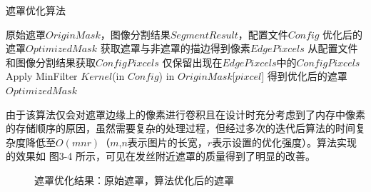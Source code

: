 \documentclass[a4paper,AutoFakeBold,oneside,12pt]{book}
\begin{document}
\begin{algorithm} 
	\begin{spacing}{1.3}
		\caption{遮罩优化算法} 
		\label{MaskOptimizationAlgorithm}
		\renewcommand{\algorithmicrequire}{\textbf{输入：}}
		\renewcommand{\algorithmicensure}{\textbf{输出：}} 
			\begin{algorithmic}[1] 
				\Require 原始遮罩$OriginMask$，图像分割结果$SegmentResult$，配置文件$Config$
				\Ensure 优化后的遮罩$OptimizedMask$
				\State 获取遮罩与非遮罩的描边得到像素$EdgePixcels$
				\State 从配置文件和图像分割结果获取$ConfigPixcels$
                \State 仅保留出现在$EdgePixcels$中的$ConfigPixcels$
                    \State Apply MinFilter $Kernel$(in $Config$) in $OriginMask$[$pixcel$]
                \EndFor
                \State 得到优化后的遮罩$OptimizedMask$
			\end{algorithmic}
	\end{spacing}
\end{algorithm}

由于该算法仅会对遮罩边缘上的像素进行卷积且在设计时充分考虑到了内存中像素的存储顺序的原因，虽然需要复杂的处理过程，但经过多次的迭代后算法的时间复杂度降低至$O(mnr)$（$m$,$n$表示图片的长宽，$r$表示设置的优化强度）。算法实现的效果如 图3-4 所示，可见在发丝附近遮罩的质量得到了明显的改善。
\begin{figure}[!htbp]
    \centering
    \quad %
    \caption{遮罩优化结果：\protect{}原始遮罩，\protect{}算法优化后的遮罩} %
    \label{Fig:MaskOptimize} %
\end{figure}
\newpage
\end{document}
